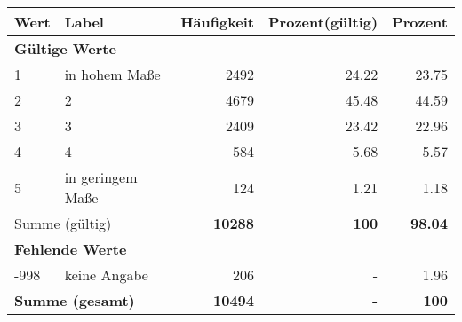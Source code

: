      \begin{longtable}{lXrrr}
     \toprule
     \textbf{Wert} & \textbf{Label} & \textbf{Häufigkeit} & \textbf{Prozent(gültig)} & \textbf{Prozent} \\
     \endhead
     \midrule
     \multicolumn{5}{l}{\textbf{Gültige Werte}}\\

     1 &
     \multicolumn{1}{X}{ in hohem Maße   } &


       \num{2492} &
       \num[round-mode=places,round-precision=2]{24.22} &
         \num[round-mode=places,round-precision=2]{23.75} \\

     2 &
     \multicolumn{1}{X}{ 2   } &


       \num{4679} &
       \num[round-mode=places,round-precision=2]{45.48} &
         \num[round-mode=places,round-precision=2]{44.59} \\

     3 &
     \multicolumn{1}{X}{ 3   } &


       \num{2409} &
       \num[round-mode=places,round-precision=2]{23.42} &
         \num[round-mode=places,round-precision=2]{22.96} \\

     4 &
     \multicolumn{1}{X}{ 4   } &


       \num{584} &
       \num[round-mode=places,round-precision=2]{5.68} &
         \num[round-mode=places,round-precision=2]{5.57} \\

     5 &
     \multicolumn{1}{X}{ in geringem Maße   } &


       \num{124} &
       \num[round-mode=places,round-precision=2]{1.21} &
         \num[round-mode=places,round-precision=2]{1.18} \\
     \midrule
     \multicolumn{2}{l}{Summe (gültig)} &
       \textbf{\num{10288}} &
     \textbf{\num{100}} &
       \textbf{\num[round-mode=places,round-precision=2]{98.04}} \\
     \multicolumn{5}{l}{\textbf{Fehlende Werte}}\\
       -998 &
       keine Angabe &
         \num{206} &
        - &
         \num[round-mode=places,round-precision=2]{1.96} \\
     \midrule
     \multicolumn{2}{l}{\textbf{Summe (gesamt)}} &
          \textbf{\num{10494}} &
        \textbf{-} &
        \textbf{\num{100}} \\
     \bottomrule
     \end{longtable}
     
